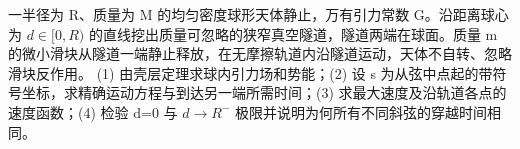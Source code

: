 一半径为 R、质量为 M 的均匀密度球形天体静止，万有引力常数 G。沿距离球心为 \(d\in[0,R)\) 的直线挖出质量可忽略的狭窄真空隧道，隧道两端在球面。质量 m 的微小滑块从隧道一端静止释放，在无摩擦轨道内沿隧道运动，天体不自转、忽略滑块反作用。
(1) 由壳层定理求球内引力场和势能；(2) 设 s 为从弦中点起的带符号坐标，求精确运动方程与到达另一端所需时间；(3) 求最大速度及沿轨道各点的速度函数；(4) 检验 d=0 与 \(d\to R^{-}\) 极限并说明为何所有不同斜弦的穿越时间相同。
